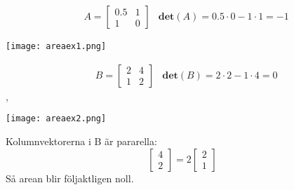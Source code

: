 \begin{Ex}
    \begin{align*}
    &A = \begin{bmatrix} 0.5&1\\1&0 \end{bmatrix} &\mathbf{det}(A) = 0.5 \cdot 0 - 1 \cdot 1 = -1
    \end{align*}
    \begin{center}
        \texttt{[image: areaex1.png]}
    \end{center}
\end{Ex}
\newpage
\begin{Ex}
    \begin{align*}
    &B = \begin{bmatrix} 2&4\\1&2 \end{bmatrix} & \mathbf{det}(B) = 2 \cdot 2 - 1 \cdot 4 = 0
    \end{align*},
    \begin{center}
        \texttt{[image: areaex2.png]}
    \end{center}
    Kolumnvektorerna i B är pararella:
    \[
        \begin{bmatrix} 4\\2 \end{bmatrix} = 2 \begin{bmatrix} 2\\1 \end{bmatrix}
    \]
    Så arean blir följaktligen noll.
\end{Ex}
